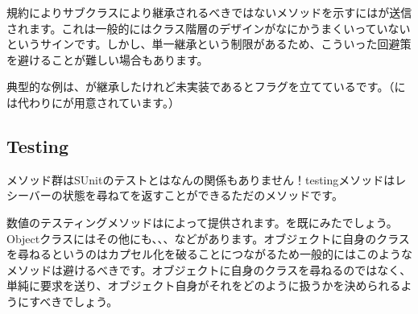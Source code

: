 \documentclass[a4paper,10pt,twoside]{book}
\begin{document}
規約によりサブクラスにより継承されるべきではないメソッドを示すにはが送信されます。これは一般的にはクラス階層のデザインがなにかうまくいっていないというサインです。しかし、単一継承という制限があるため、こういった回避策を避けることが難しい場合もあります。

典型的な例は、が継承したけれど未実装であるとフラグを立てているです。（には代わりにが用意されています。）



\subsection{Testing}

メソッド群はSUnitのテストとはなんの関係もありません！testingメソッドはレシーバーの状態を尋ねてを返すことができるただのメソッドです。

数値のテスティングメソッドはによって提供されます。を既にみたでしょう。Objectクラスにはその他にも、、、などがあります。オブジェクトに自身のクラスを尋ねるというのはカプセル化を破ることにつながるため一般的にはこのようなメソッドは避けるべきです。オブジェクトに自身のクラスを尋ねるのではなく、単純に要求を送り、オブジェクト自身がそれをどのように扱うかを決められるようにすべきでしょう。
\end{document}
